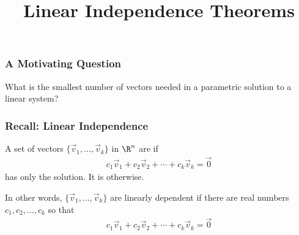 \title{Linear Independence Theorems} 
\subtitle{\SubTitleName}
\institute[]{\Course}
\author{\Instructor}
\maketitle   





\begin{frame}
\frametitle{A Motivating Question}

What is the smallest number of vectors needed in a parametric solution to a linear system?

\end{frame}



\begin{frame}
\frametitle{Recall: Linear Independence}

A set of vectors $\{\vec v_1,\ldots,\vec v_k\}$ in $\R^n$ are  if 
\begin{align*}
    c_1 \vec v_1+c_2 \vec v_2+\cdots+c_k \vec v_k= \vec 0
\end{align*}
has only the  solution. It is  otherwise.

\vspace{0.5cm} 

In other words, $\{\vec v_1,\ldots,\vec v_k\}$ are linearly dependent if there are real numbers $c_1,c_2,\ldots ,c_k$  so that
\begin{align*}
 c_1 \vec v_1+c_2 \vec v_2+\cdots+c_k \vec v_k= \vec 0
\end{align*}

\end{frame}





